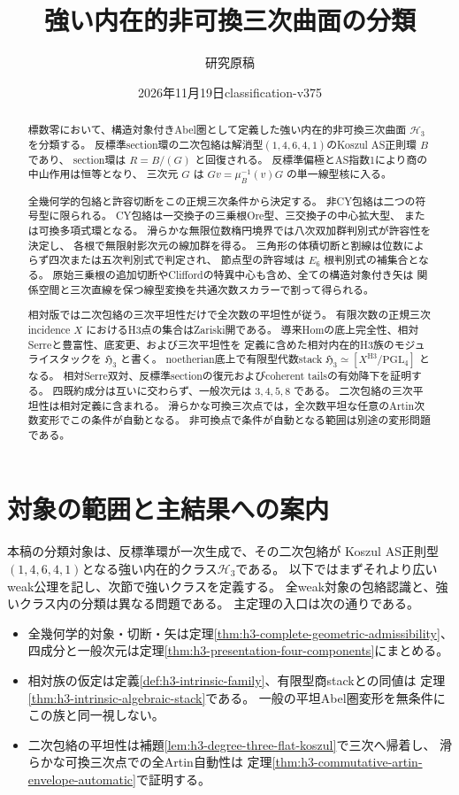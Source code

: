 \documentclass[11pt,a4paper]{ltjsarticle}
\title{強い内在的非可換三次曲面の分類}
\author{研究原稿}
\date{2026年11月19日\quad classification-v375}
\theoremstyle{definition}\newtheorem{definition}[theorem]{定義}
\begin{document}
\maketitle
\begin{abstract}
標数零において、構造対象付きAbel圏として定義した強い内在的非可換三次曲面
$\mathcal H_3$ を分類する。
反標準section環の二次包絡は解消型$(1,4,6,4,1)$のKoszul AS正則環 $B$ であり、
section環は $R=B/(G)$ と回復される。
反標準偏極とAS指数1により商の中山作用は恒等となり、
三次元 $G$ は $Gv=\mu_B^{-1}(v)G$ の単一線型核に入る。

全幾何学的包絡と許容切断をこの正規三次条件から決定する。
非CY包絡は二つの符号型に限られる。
CY包絡は一交換子の三乗根Ore型、三交換子の中心拡大型、
または可換多項式環となる。
滑らかな無限位数楕円境界では八次双加群判別式が許容性を決定し、
各根で無限射影次元の線加群を得る。
三角形の体積切断と割線は位数によらず四次または五次判別式で判定され、
節点型の許容域は $E_6$ 根判別式の補集合となる。
原始三乗根の追加切断やCliffordの特異中心も含め、全ての構造対象付き矢は
関係空間と三次直線を保つ線型変換を共通次数スカラーで割って得られる。

相対版では二次包絡の三次平坦性だけで全次数の平坦性が従う。
有限次数の正規三次incidence $X$ におけるH3点の集合はZariski開である。
導来Homの底上完全性、相対Serreと豊富性、底変更、および三次平坦性を
定義に含めた相対内在的H3族のモジュライスタックを $\mathfrak H_3$ と書く。
noetherian底上で有限型代数stack
$\mathfrak H_3\simeq[X^{\mathrm{H3}}/\mathrm{PGL}_4]$ となる。
相対Serre双対、反標準sectionの復元およびcoherent tailsの有効降下を証明する。
四既約成分は互いに交わらず、一般次元は $3,4,5,8$ である。
二次包絡の三次平坦性は相対定義に含まれる。
滑らかな可換三次点では，全次数平坦な任意のArtin次数変形でこの条件が自動となる。
非可換点で条件が自動となる範囲は別途の変形問題である。
\end{abstract}
\tableofcontents

\section{対象の範囲と主結果への案内}
本稿の分類対象は、反標準環が一次生成で、その二次包絡が
Koszul AS正則型$(1,4,6,4,1)$となる強い内在的クラス$\mathcal H_3$である。
以下ではまずそれより広いweak公理を記し、次節で強いクラスを定義する。
全weak対象の包絡認識と、強いクラス内の分類は異なる問題である。
主定理の入口は次の通りである。
\begin{itemize}
\item 全幾何学的対象・切断・矢は定理\ref{thm:h3-complete-geometric-admissibility}、
四成分と一般次元は定理\ref{thm:h3-presentation-four-components}にまとめる。
\item 相対族の仮定は定義\ref{def:h3-intrinsic-family}、有限型商stackとの同値は
定理\ref{thm:h3-intrinsic-algebraic-stack}である。
一般の平坦Abel圏変形を無条件にこの族と同一視しない。
\item 二次包絡の平坦性は補題\ref{lem:h3-degree-three-flat-koszul}で三次へ帰着し、
滑らかな可換三次点での全Artin自動性は
定理\ref{thm:h3-commutative-artin-envelope-automatic}で証明する。
\end{itemize}
\end{document}
